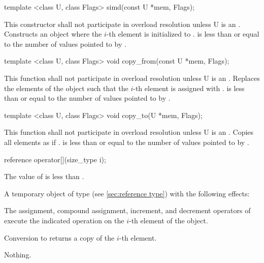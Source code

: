 \begin{itemdecl}
template <class U, class Flags> simd(const U *mem, Flags);
\end{itemdecl}
\begin{itemdescr}
  \pnum\remarks This constructor shall not participate in overload resolution unless \type U is an \realArithmeticType.
  \pnum\effects Constructs an object where the $i$-th element is initialized to  \foralli.
  \pnum\requires {} is less than or equal to the number of values pointed to by .
\end{itemdescr}

\begin{itemdecl}
template <class U, class Flags> void copy_from(const U *mem, Flags);
\end{itemdecl}
\begin{itemdescr}
  \pnum\remarks This function shall not participate in overload resolution unless \type U is an \realArithmeticType.
  \pnum\effects Replaces the elements of the \simd object such that the $i$-th element is assigned with  \foralli.
  \pnum\requires {} is less than or equal to the number of values pointed to by .
\end{itemdescr}

\begin{itemdecl}
template <class U, class Flags> void copy_to(U *mem, Flags);
\end{itemdecl}
\begin{itemdescr}
  \pnum\remarks This function shall not participate in overload resolution unless \type U is an \realArithmeticType.
  \pnum\effects Copies all \simd elements as if  \foralli.
  \pnum\requires {} is less than or equal to the number of values pointed to by .
\end{itemdescr}

\newcommand\simdElementReference[1]{
  \pnum\requires The value of \code{i} is less than \code{size()}.

  \pnum\returns A temporary object of type \referencetype (see \ref{sec:reference type}) with the following effects:

  \pnum\effects The assignment, compound assignment, increment, and decrement operators of \referencetype execute the indicated operation on the $i$-th element of the #1 object.

  \pnum\effects Conversion to \valuetype returns a copy of the $i$-th element.

  \pnum\throws Nothing.
}
\begin{itemdecl}
reference operator[](size_type i);
\end{itemdecl}
\begin{itemdescr}
  \simdElementReference{\simd{}}
\end{itemdescr}

